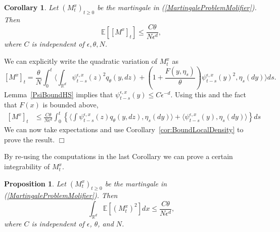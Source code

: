 \documentclass[12pt]{article}
\newenvironment {proof}{{\noindent\bf Proof }}{\hfill $\Box$ \medskip}
\newtheorem{proposition}[theorem]{Proposition}
\newtheorem{corollary}[theorem]{Corollary}
\newcommand{\IE}{\mathbb E}
\newcommand{\IR}{\mathbb R}
\begin{document}
\begin{corollary}
    Let $(M_t^x)_{t \geq 0}$ be the martingale in (\ref{MartingaleProblemMolifier}).
    Then
    \[
        \IE\left[ [M^x]_t \right] \leq \frac{C \theta}{ N \epsilon^{d}} ,
    \]
    where $C$ is independent of $\epsilon,\theta,N$. \label{Cor:ControlQVMQ}
\end{corollary}

\begin{proof}
    We can explicitly write the quadratic variation of $M^x_t$ as
    \[
        [M^x]_t
        =
        \frac{\theta}{N} \int_0^t \langle
            \int_{\IR^d} \psi_{t-s}^{\epsilon,x}(z)^2 q_\theta(y,dz)
            +
            \left(1 + \frac{F(y, \eta_s)}{\theta}\right) \psi_{t-s}^{\epsilon,x}(y)^2,
        \eta_s(dy) \rangle  ds .
    \]
    Lemma~\ref{PsiBoundHS} implies that $\psi_{t-s}^{\epsilon,x}(y) \le C \epsilon^{-d}$.
    Using this and the fact that $F(x)$ is bounded above,
    \begin{align} \label{QuadVarBound}
    [M^x]_t
        &\leq
        \frac{C \theta}{N \epsilon^d} \int_0^t \left\{
            \langle \int \psi_{t-s}^{\epsilon,x}(z) q_\theta(y,dz), \eta_s(dy) \rangle
            +
            \langle \psi_{t-s}^{\epsilon,x}(y), \eta_s(dy)\rangle
        \right\} ds 
    \end{align}
    We can now take expectations and use Corollary~\ref{cor:BoundLocalDensity} to prove the result.
\end{proof}

By re-using the computations in the last Corollary we can prove a certain integrability of $M_t^x$.

\begin{proposition}  \label{IntegrabilityOfM}
    Let $(M_t^x)_{t \geq 0}$ be the martingale in (\ref{MartingaleProblemMolifier}).
    Then
    \[
        \int_{\IR^d} \IE\left[ (M_t^x)^2 \right] dx \leq \frac{C \theta}{ N \epsilon^{d}} ,
    \]
    where $C$ is independent of $\epsilon$, $\theta$, and $N$.
\end{proposition}
\end{document}
